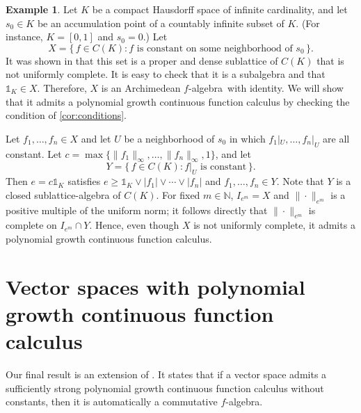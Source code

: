 \documentclass{amsart}
\theoremstyle{plain}
\theoremstyle{definition}
\newtheorem{example}[thm]{Example}
\theoremstyle{remark}
\newcommand\N{\ensuremath{\mathbb{N}}}
\newcommand{\one}{\mathbb{1}}
\newcommand{\falg}{$f\!$-algebra}
\begin{document}
\begin{example}
    Let $K$ be a compact Hausdorff space of infinite cardinality, and
    let $s_0\in K$ be an accumulation point of a countably infinite
    subset of $K$. (For instance, $K=[0,1]$ and $s_0=0$.) Let
    \[
    X=\{\, f\in C(K) : f\text{ is constant on some neighborhood of
    }s_0 \, \}.
    \]
    It was shown in \cite[Proposition 3.1]{laustsen_troitsky2020} that
    this set is a proper and dense sublattice of $C(K)$ that is not
    uniformly complete. It is easy to check that it is a
    subalgebra and that $\one_K \in X$. Therefore, $X$ is an Archimedean
    \falg\ with identity. We will show that it admits a polynomial
    growth continuous function calculus by checking the condition of
    \cref{cor:conditions}.

    Let $f_1,\ldots ,f_n \in X$ and let $U$ be a neighborhood of
    $s_0$ in which $f_1|_U,\ldots ,f_n|_{U}$ are all constant. Let
    $c=\max\{\|f_1\|_\infty ,\ldots ,\|f_n\|_\infty ,1\}$, and let
    \[
    Y=\{\, f \in C(K) : f|_U\text{ is constant} \, \}.
    \]
    Then $e=c\one_K$ satisfies $e\ge \one_K \vee |f_1|\vee \cdots \vee
    |f_n|$ and $f_1,\ldots ,f_n \in Y$. Note that $Y$ is a closed
    sublattice-algebra of $C(K)$. For fixed $m \in \N$,
    $I_{e^{m}}=X$ and $\|{\cdot }\|_{e^{m}}$ is a positive multiple of
    the uniform norm;
    it follows directly that
    $\|{\cdot }\|_{e^{m}}$ is complete on $I_{e^{m}}\cap Y$. Hence,
    even though $X$ is not uniformly complete, it admits a polynomial
    growth continuous function calculus.
\end{example}

\section{Vector spaces with polynomial growth continuous function
calculus}\label{sec:final}

Our final result is an extension of \cite[Theorem
1.4]{laustsen_troitsky2020}. It states that if a
vector space admits a sufficiently strong polynomial growth
continuous function calculus without constants, then it is automatically a commutative \falg.
\end{document}
